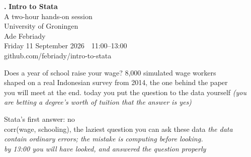 \documentclass[aspectratio=169,11pt]{beamer}
\begin{document}
{%
\begin{frame}[plain]
  \centering
  \vfill
  {\ttfamily\bfseries\color{Amber}\Large .\hspace{0.45em}}%
  {\color{white}\Huge\bfseries Intro to Stata}\\[1.0em]
  {\color{PaperSoft}\large A two-hour hands-on session}\\[0.35em]
  {\color{MutedOnInk}University of Groningen}\\[2.2em]
  {\color{PaperSoft}Ade Febriady}\\[0.35em]
  {\color{MutedOnInk}\small Friday 11 September 2026 \,\textperiodcentered\,
   11:00--13:00}\\[2.0em]
  {\ttfamily\color{SoftBlue}\large github.com/febriady/intro-to-stata}
  \vfill
\end{frame}}

\begin{frame}{Does a year of school raise your wage?}
  \vfill
  \centering
  {\Large 8{,}000 simulated wage workers}\\[0.9em]
  {\color{WarmGray}shaped on a real Indonesian survey from 2014, the one
   behind the paper\\ you will meet at the end. today you put the question
   to the data yourself}
  \vfill
  \raggedleft
  {\small\color{WarmGray}\itshape (you are betting a degree's worth of
   tuition that the answer is yes)}
  \par\vspace*{0.3cm}
\end{frame}

\begin{frame}{Stata's first answer: no}
  \vfill
  \centering
  {\ttfamily\bfseries\color{PromptMaroon}\fontsize{66}{70}}\\[1.6em]
  {\color{WarmGray}corr(wage, schooling), the laziest question you can
   ask these data}
  \vfill
  \raggedleft
  {\small\color{PromptMaroon}\itshape the data contain ordinary errors;
   the mistake is computing before looking.\\ by 13:00 you will have
   looked, and answered the question properly}
  \par\vspace*{0.3cm}
\end{frame}
\end{document}
